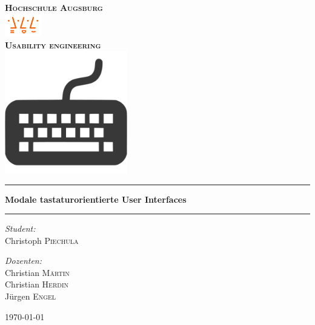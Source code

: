 \begin{titlepage}
\pagecolor{titlepagecolor}
\begin{center}

\bf
\color{titlepagefontcolor}
\textsc{\huge Hochschule Augsburg}\\[0.5cm]
\includegraphics[width=0.12\textwidth]{docs/pics/hslogo.png}~\\[0.5cm]
\textsc{\LARGE Usability engineering}\\[0.5cm]

\includegraphics[width=0.40\textwidth]{docs/pics/title.png}~\\[0.5cm]

\rule{\linewidth}{0.5mm}
{\huge \bfseries Modale tastaturorientierte User Interfaces\\[0.4cm] }
\rule{\linewidth}{0.5mm}

\noindent
\begin{minipage}[t]{0.4\textwidth}
\begin{flushleft} \Large
\emph{Student:}\\
\textnormal{Christoph \textsc{Piechula}}
\end{flushleft}
\end{minipage}%
\begin{minipage}[t]{0.4\textwidth}
\begin{flushright} \Large
\emph{Dozenten:} \\
\textnormal{Christian \textsc{Märtin}\\Christian \textsc{Herdin}\\Jürgen \textsc{Engel}}
\end{flushright}
\end{minipage}

\vfill

{\large \today}
\end{center}
\end{titlepage}
\nopagecolor

